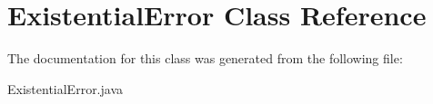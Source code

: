 \hypertarget{classExistentialError}{
\section{ExistentialError Class Reference}
\label{classExistentialError}
}


The documentation for this class was generated from the following file:\begin{DoxyCompactItemize}
\item 
ExistentialError.java\end{DoxyCompactItemize}
